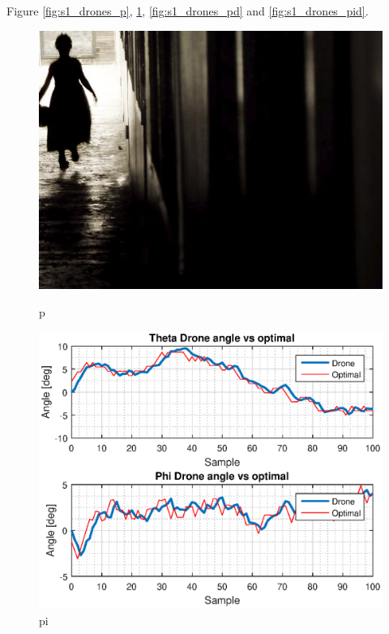 Figure \ref{fig:s1_drones_p}, \ref{fig:s1_drones_pi}, \ref{fig:s1_drones_pd} and \ref{fig:s1_drones_pid}.
\begin{figure}[H]
\begin{minipage}[t]{0.45\textwidth}
\includegraphics[width=\linewidth]{figures/randomfigure.jpg}
\caption{p}
\label{fig:s1_drones_p}
\end{minipage}
\hspace{\fill}
\begin{minipage}[t]{0.45\textwidth}
\includegraphics[width=\linewidth]{figures/s2_pi_drone_theta_phi_optimal.eps}
\caption{pi}
\label{fig:s1_drones_pi}
\end{minipage}


\end{figure}
